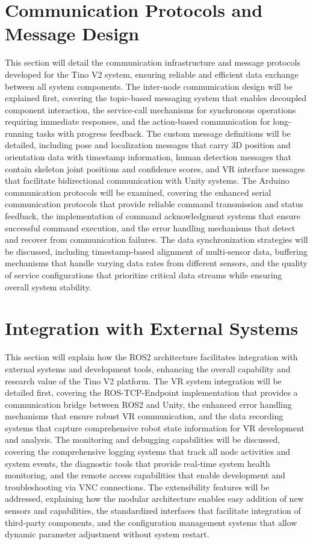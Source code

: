 \section{Communication Protocols and Message Design}
This section will detail the communication infrastructure and message protocols developed for the Tino V2 system, ensuring reliable and efficient data exchange between all system components. The inter-node communication design will be explained first, covering the topic-based messaging system that enables decoupled component interaction, the service-call mechanisms for synchronous operations requiring immediate responses, and the action-based communication for long-running tasks with progress feedback. The custom message definitions will be detailed, including pose and localization messages that carry 3D position and orientation data with timestamp information, human detection messages that contain skeleton joint positions and confidence scores, and VR interface messages that facilitate bidirectional communication with Unity systems. The Arduino communication protocols will be examined, covering the enhanced serial communication protocols that provide reliable command transmission and status feedback, the implementation of command acknowledgment systems that ensure successful command execution, and the error handling mechanisms that detect and recover from communication failures. The data synchronization strategies will be discussed, including timestamp-based alignment of multi-sensor data, buffering mechanisms that handle varying data rates from different sensors, and the quality of service configurations that prioritize critical data streams while ensuring overall system stability.

\section{Integration with External Systems}
This section will explain how the ROS2 architecture facilitates integration with external systems and development tools, enhancing the overall capability and research value of the Tino V2 platform. The VR system integration will be detailed first, covering the ROS-TCP-Endpoint implementation that provides a communication bridge between ROS2 and Unity, the enhanced error handling mechanisms that ensure robust VR communication, and the data recording systems that capture comprehensive robot state information for VR development and analysis. The monitoring and debugging capabilities will be discussed, covering the comprehensive logging systems that track all node activities and system events, the diagnostic tools that provide real-time system health monitoring, and the remote access capabilities that enable development and troubleshooting via VNC connections. The extensibility features will be addressed, explaining how the modular architecture enables easy addition of new sensors and capabilities, the standardized interfaces that facilitate integration of third-party components, and the configuration management systems that allow dynamic parameter adjustment without system restart.

